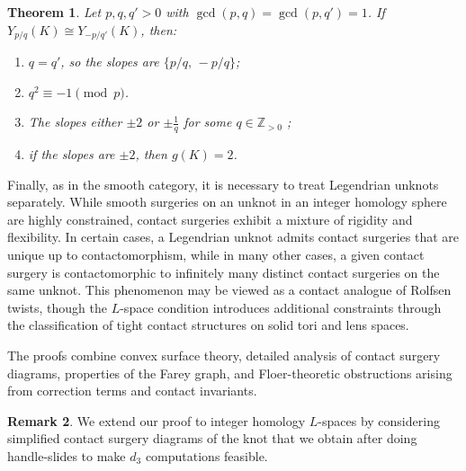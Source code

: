 \documentclass[12pt]{amsart}
\newtheorem{theorem}{Theorem}[section]
\theoremstyle{definition}
\newtheorem{remark} [theorem] {Remark}
\theoremstyle{definition}
\newcommand{\Z}{{\mathbb{Z}}}
\begin{document}
\begin{theorem}\label{adaptedHanselman}
Let $p, q, q' > 0$ with $\gcd(p,q)=\gcd(p,q')=1$. If $Y_{p/q}(K) \cong Y_{-p/q'}(K)$, then:
\begin{enumerate}

\item[\rm (a)] $q = q'$, so the slopes are $\{p/q,\, -p/q\}$;
\item[\rm (b)] $q^2 \equiv -1 \pmod{p}$.
\item[\rm (c)] The slopes either $\pm 2$ or $\pm \frac{1}{ q}$
for some $q \in \Z_{> 0}$
\qquad {};
\item[\rm (d)] if the slopes are $\pm 2$, then $g(K) = 2$.

\end{enumerate}
\end{theorem}


Finally, as in the smooth category, it is necessary to treat Legendrian unknots separately. While smooth surgeries on an unknot in an integer homology sphere are highly constrained, contact surgeries exhibit a mixture of rigidity and flexibility. In certain cases, a Legendrian unknot admits contact surgeries that are unique up to contactomorphism, while in many other cases, a given contact surgery is contactomorphic to infinitely many distinct contact surgeries on the same unknot. This phenomenon may be viewed as a contact analogue of Rolfsen twists, though the $L$-space condition introduces additional constraints through the classification of tight contact structures on solid tori and lens spaces.

The proofs combine convex surface theory, detailed analysis of contact surgery diagrams, properties of the Farey graph, and Floer-theoretic obstructions arising from correction terms and contact invariants.
\begin{remark}
    We extend our proof to integer homology $L$-spaces by considering simplified contact surgery diagrams of the knot that we obtain after doing handle-slides to make $d_3$ computations feasible.
\end{remark}
\end{document}
